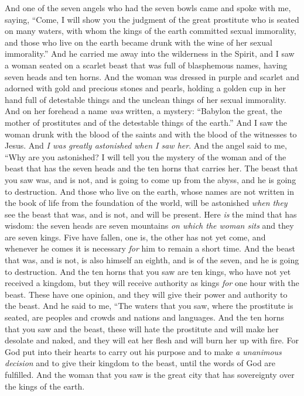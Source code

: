 \begin{biblechapter} %
 And one of the seven angels who had the seven bowls came and spoke with me, saying, “Come, I will show you the judgment of the great prostitute who is seated on many waters,
\verse with whom the kings of the earth committed sexual immorality, and those who live on the earth became drunk with the wine of her sexual immorality.”
\verse And he carried me away into the wilderness in the Spirit, and I saw a woman seated on a scarlet beast that was full of blasphemous names, having seven heads and ten horns.
\verse And the woman was dressed in purple and scarlet and adorned with gold and precious stones and pearls, holding a golden cup in her hand full of detestable things and the unclean things of her sexual immorality.
\verse And on her forehead a name \textit{was} written, a mystery: “Babylon the great, the mother of prostitutes and of the detestable things of the earth.”
\verse And I saw the woman drunk with the blood of the saints and with the blood of the witnesses to Jesus.
\verse And \textit{I was greatly astonished when I saw her}.
\verse And the angel said to me, “Why are you astonished? I will tell you the mystery of the woman and of the beast that has the seven heads and the ten horns that carries her.
\verse The beast that you saw was, and is not, and is going to come up from the abyss, and he is going to destruction. And those who live on the earth, whose names are not written in the book of life from the foundation of the world, will be astonished \textit{when they} see the beast that was, and is not, and will be present.
\verse Here \textit{is} the mind that has wisdom: the seven heads are seven mountains \textit{on which the woman sits} and they are seven kings.
\verse Five have fallen, one is, the other has not yet come, and whenever he comes it is necessary \textit{for} him to remain a short time.
\verse And the beast that was, and is not, is also himself an eighth, and is of the seven, and he is going to destruction.
\verse And the ten horns that you saw are ten kings, who have not yet received a kingdom, but they will receive authority as kings \textit{for} one hour with the beast.
\verse These have one opinion, and they will give their power and authority to the beast.
\verse And he said to me, “The waters that you saw, where the prostitute is seated, are peoples and crowds and nations and languages.
\verse And the ten horns that you saw and the beast, these will hate the prostitute and will make her desolate and naked, and they will eat her flesh and will burn her up with fire.
\verse For God put into their hearts to carry out his purpose and to make \textit{a unanimous decision} and to give their kingdom to the beast, until the words of God are fulfilled.
\verse And the woman that you saw is the great city that has sovereignty over the kings of the earth.
\end{biblechapter}

